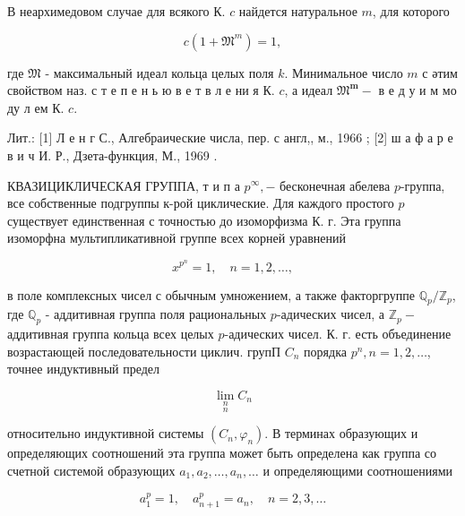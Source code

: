 \documentclass[10pt]{article}
\begin{document}
В неархимедовом случае для всякого К. $c$ найдется натуральное $m$, для которого



\[

c\left(1+\mathfrak{M}^{m}\right)=1,

\]



где $\mathfrak{M}$ - максимальный идеал кольца целых поля $k$. Минимальное число $m$ с әтим свойством наз. с т е п е н ь ю в е т в л е ни я К. $c$, а идеал $\mathfrak{M}^{\boldsymbol{m}}-$ в е д у и м мо ду л ем К. $c$.



Лит.: [1] Л е н г С., Алгебраические числа, пер. с англ,, м., 1966 ; [2] ш а ф а р е в и ч И. Р., Дзета-функция, М., 1969 .



КВАЗИЦИКЛИЧЕСКАЯ ГРУППА, т и п а $p^{\infty},-$ бесконечная абелева $p$-группа, все собственные подгруппы к-рой циклические. Для каждого простого $p$ существует единственная с точностью до изоморфизма К. г. Эта группа изоморфна мультипликативной группе всех корней уравнений



\[

x^{p^{n}}=1, \quad n=1,2, \ldots,

\]



в поле комплексных чисел с обычным умножением, а также факторгруппе $\mathbb{Q}_{p} / \mathbb{Z}_{p}$, где $\mathbb{Q}_{p}$ - аддитивная группа поля рациональных $p$-адических чисел, а $\mathbb{Z}_{p}-$ аддитивная группа кольца всех целых $p$-адических чисел. К. г. есть объединение возрастающей последовательности циклич. групП $C_{n}$ порядка $p^{n}, n=1,2, \ldots$, точнее индуктивный предел



\[

\underset{n}{\lim _{n}} C_{n}

\]



относительно индуктивной системы $\left(C_{n}, \varphi_{n}\right)$. В терминах образующих и определяющих соотношений эта группа может быть определена как группа со счетной системой образующих $a_{1}, a_{2}, \ldots, a_{n}, \ldots$ и определяющими соотношениями



\[

a_{1}^{p}=1, \quad a_{n+1}^{p}=a_{n}, \quad n=2,3, \ldots

\]
\end{document}
